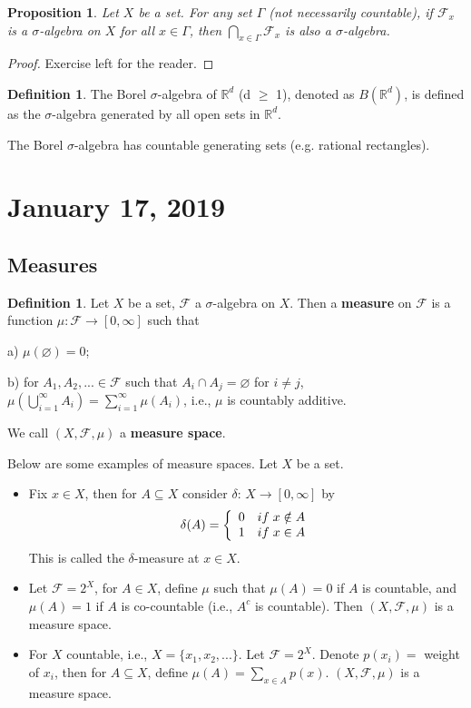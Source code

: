 \documentclass{article}
\newtheorem{proposition}[theorem]{Proposition}
\theoremstyle{definition}
\newtheorem{definition}[theorem]{Definition}
\begin{document}
\begin{proposition}
Let $X$ be a set. For any set $\Gamma$ (not necessarily countable), if $\mathscr{F}_x$ is a $\sigma$-algebra on $X$ for all $x \in \Gamma$, then $\bigcap_{x \in \Gamma} \mathscr{F}_x$ is also a $\sigma$-algebra.
\end{proposition}
\begin{proof}
	Exercise left for the reader.
\end{proof}

\begin{definition}
The Borel $\sigma$-algebra of $\mathbb{R}^d$ (d $\geq$ 1), denoted as $B(\mathbb{R}^d)$, 
is defined as the $\sigma$-algebra generated by all open sets in $\mathbb{R}^d$. 
\end{definition}
The Borel $\sigma$-algebra has countable generating sets (e.g. rational rectangles).


\section{January 17, 2019}

\subsection{Measures}

\begin{definition}
Let $X$ be a set, $\mathscr{F}$ a $\sigma$-algebra on $X$. Then a {\bf measure} on $\mathscr{F}$ is a function $\mu: \mathscr{F} \longrightarrow [0,\infty]$ such that

a) $\mu(\varnothing) = 0$;

b) for $A_1, A_2,... \in \mathscr{F}$ such that $A_i \cap A_j = \varnothing$ for $i \neq j$, $\mu(\bigcup_{i = 1}^\infty A_i) = \sum_{i=1}^\infty \mu(A_i)$, i.e., $\mu$ is countably additive. 

We call $(X,\mathscr{F},\mu)$ a {\bf measure space}.
\end{definition}

Below are some examples of measure spaces. Let $X$ be a set.
\begin{itemize}
    \item Fix $x \in X$, then for $A \subseteq X$ consider $\delta$: $X \longrightarrow [0,\infty]$ by $$\delta(A) = \left\{  
        \begin{array}{cc}
        0 & if \hspace{1mm} x \notin A \\
        1 & if \hspace{1mm} x \in A
    \end{array}\right.
    $$ 
    This is called the $\delta$-measure at $x \in X$.
    \item Let $\mathscr{F} = 2^X$, for $A \in X$, define $\mu$ such that $\mu(A) = 0$ if $A$ is countable, and $\mu(A) = 1$ if $A$ is co-countable (i.e., $A^c$ is countable). Then $(X,\mathscr{F},\mu)$ is a measure space.
    \item For $X$ countable, i.e., $X = \{x_1, x_2,...\}$. Let $\mathscr{F} = 2^X$. Denote 
    $p(x_i) =$ weight of $x_i$, then for $A \subseteq X$, define $\mu(A) = \sum_{x \in A}p(x)$. $(X,\mathscr{F}, \mu)$ is a measure space.
\end{itemize}
\end{document}
